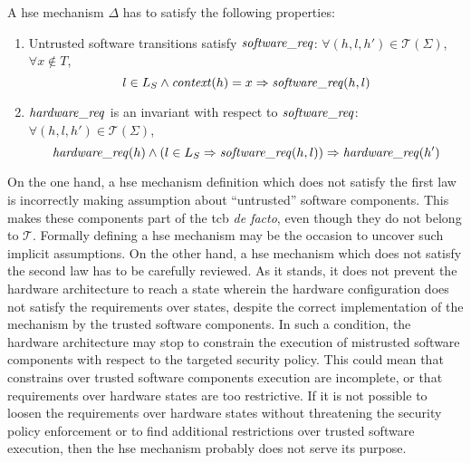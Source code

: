 \begin{definition}
  \label{def:speccert:laws}
  A \ac{hse} mechanism $\Delta$ has to satisfy the following properties:
  \begin{enumerate}
  \item Untrusted software transitions satisfy $\mathit{software\_req}$:
    $\forall (h, l, h') \in \mathcal{T}(\Sigma)$, $\forall x \not\in T$,
    \[
      l \in L_S \wedge \mathit{context}(h) = x \Rightarrow \mathit{software\_req}(h,
      l)
    \]
  \item $\mathit{hardware\_req}$ is an invariant with respect to
    $\mathit{software\_req}$: $\forall (h, l, h') \in \mathcal{T}(\Sigma)$,
    \[
      \mathit{hardware\_req}(h) \wedge (l \in L_S \Rightarrow
      \mathit{software\_req}(h,l)) \Rightarrow \mathit{hardware\_req}(h')
    \]
  \end{enumerate}
\end{definition}

On the one hand, a \ac{hse} mechanism definition which does not satisfy the
first law is incorrectly making assumption about ``untrusted'' software
components.
%
This makes these components part of the \ac{tcb} \emph{de facto}, even though
they do not belong to $\mathcal{T}$.
%
Formally defining a \ac{hse} mechanism may be the occasion to uncover such
implicit assumptions.
%
On the other hand, a \ac{hse} mechanism which does not satisfy the second law
has to be carefully reviewed.
%
As it stands, it does not prevent the hardware architecture to reach a state
wherein the hardware configuration does not satisfy the requirements over
states, despite the correct implementation of the mechanism by the trusted
software components.
%
In such a condition, the hardware architecture may stop to constrain the
execution of mistrusted software components with respect to the targeted
security policy.
%
This could mean that constrains over trusted software components execution are
incomplete, or that requirements over hardware states are too restrictive.
%
If it is not possible to loosen the requirements over hardware states without
threatening the security policy enforcement or to find additional restrictions
over trusted software execution, then the \ac{hse} mechanism probably does not
serve its purpose.

